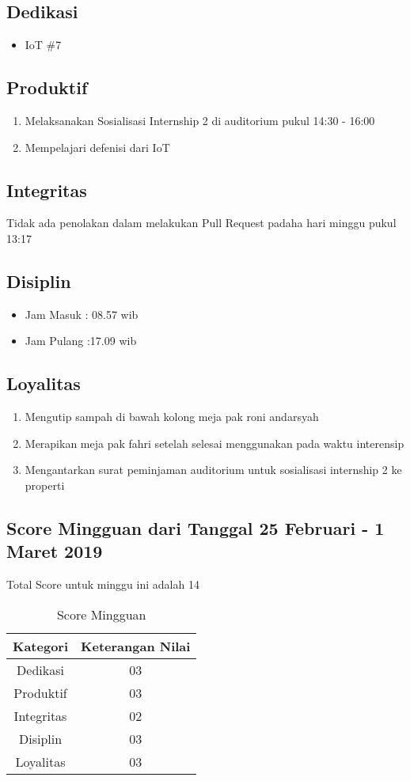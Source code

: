 \subsection{Dedikasi}
\begin{itemize}
\item IoT \#7
\end{itemize}
\subsection{Produktif}
\begin{enumerate}
\item Melaksanakan Sosialisasi Internship 2 di auditorium pukul 14:30 - 16:00
\item Mempelajari defenisi dari IoT
\end{enumerate}
\subsection{Integritas}
Tidak ada penolakan dalam melakukan Pull Request padaha hari minggu pukul 13:17
\subsection{Disiplin}
\begin{itemize}
\item Jam Masuk : 08.57 wib
\item Jam Pulang :17.09 wib
\end{itemize}
\subsection{Loyalitas}
\begin{enumerate}
\item Mengutip sampah di bawah kolong meja pak roni andarsyah
\item Merapikan meja pak fahri setelah selesai menggunakan pada waktu interensip
\item Mengantarkan surat peminjaman auditorium untuk sosialisasi internship 2 ke properti
\end{enumerate}


\subsection{Score Mingguan dari Tanggal 25 Februari - 1 Maret 2019}
Total Score untuk minggu ini adalah 14

\begin{table}[h]
\caption{Score Mingguan}
\centering
\begin{tabular}{|c|c|}
\hline
\textbf{Kategori}&\textbf{Keterangan Nilai}\\
\hline
Dedikasi&03\\
\hline
Produktif&03\\
\hline
Integritas&02\\
\hline
Disiplin&03\\
\hline
Loyalitas&03\\
\hline
\end{tabular}
\label{table:score mingguan}
\end{table}

